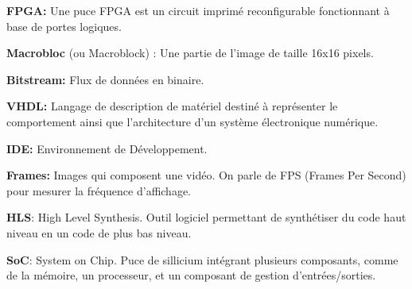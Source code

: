 \documentclass[
  french,
]{article}
\begin{document}
\textbf{FPGA:} Une puce FPGA est un circuit imprimé reconfigurable
fonctionnant à base de portes logiques.

\textbf{Macrobloc }(ou Macroblock) : Une partie de l'image de taille
16x16 pixels.

\textbf{Bitstream:} Flux de données en binaire.

\textbf{VHDL:} Langage de description de matériel destiné à représenter
le comportement ainsi que l'architecture d'un système électronique
numérique.

\textbf{IDE:} Environnement de Développement.

\textbf{Frames:} Images qui composent une vidéo. On parle de FPS (Frames
Per Second) pour mesurer la fréquence d'affichage.

\textbf{HLS}: High Level Synthesis. Outil logiciel permettant de
synthétiser du code haut niveau en un code de plus bas niveau.

\textbf{SoC}: System on Chip. Puce de sillicium intégrant plusieurs
composants, comme de la mémoire, un processeur, et un composant de
gestion d'entrées/sorties.
\end{document}
